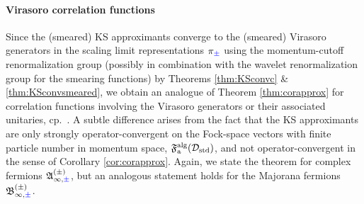 \documentclass[a4paper, 11pt]{article}
\newcommand{\fA}{\mathfrak{A}}\newcommand{\cA}{\mathcal{A}}\newcommand{\dA}{\mathds{A}}\newcommand{\sA}{\mathscr{A}}
\newcommand{\ua}{\textup a}
\newcommand{\fB}{\mathfrak{B}}\newcommand{\cB}{\mathcal{B}}\newcommand{\dB}{\mathds{B}}\newcommand{\sB}{\mathscr{B}}
\newcommand{\fF}{\mathfrak{F}}\newcommand{\cF}{\mathcal{F}}\newcommand{\dF}{\mathds{F}}\newcommand{\sF}{\mathscr{F}}
\DeclareMathOperator{\1}{\mathds{1}}
\DeclareMathOperator{\std}{std}
\DeclareMathOperator{\alg}{alg}
\begin{document}
\paragraph{Virasoro correlation functions}
Since the (smeared) KS approximants converge to the (smeared) Virasoro generators in the scaling limit representations $\pi_{{\color{blue}\pm}}$ using the momentum-cutoff renormalization group (possibly in combination with the wavelet renormalization group for the smearing functions) by Theorems \ref{thm:KSconvc} \& \ref{thm:KSconvsmeared}, we obtain an analogue of Theorem \ref{thm:corapprox} for correlation functions involving the Virasoro generators or their associated unitaries, cp.~\cite{ZiniConformalFieldTheories}. A subtle difference arises from the fact that the KS approximants are only strongly operator-convergent on the Fock-space vectors with finite particle number in momentum space, $\fF^{\alg}_{\ua}(\cD_{\std})$, and not operator-convergent in the sense of Corollary \ref{cor:corapprox}. Again, we state the theorem for complex fermions $\fA^{(\pm)}_{\infty,{\color{blue}\pm}}$, but an analogous statement holds for the Majorana fermions $\fB^{(\pm)}_{\infty,{\color{blue}\pm}}$.
\end{document}
